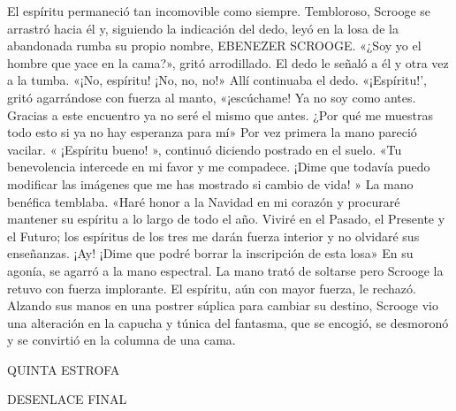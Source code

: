 \documentclass{novela}
\begin{document}
 El espíritu permaneció tan incomovible como siempre.
 Tembloroso, Scrooge se arrastró hacia él y, siguiendo la indicación del dedo, leyó en la losa de la abandonada rumba su propio nombre, EBENEZER SCROOGE.
 «¿Soy yo el hombre que yace en la cama?», gritó arrodillado.
 El dedo le señaló a él y otra vez a la tumba.
 «¡No, espíritu! ¡No, no, no!»
 Allí continuaba el dedo.
 «¡Espíritu!', gritó agarrándose con fuerza al manto, «¡escúchame! Ya no soy como antes. Gracias a este encuentro ya no seré el mismo que antes. ¿Por qué me muestras todo esto si ya no hay esperanza para mí»
 Por vez primera la mano pareció vacilar.
 « ¡Espíritu bueno! », continuó diciendo postrado en el suelo. «Tu benevolencia intercede en mi favor y me compadece. ¡Dime que todavía puedo modificar las imágenes que me has mostrado si cambio de vida! »
 La mano benéfica temblaba.
 «Haré honor a la Navidad en mi corazón y procuraré mantener su espíritu a lo largo de todo el año. Viviré en el Pasado, el Presente y el Futuro; los espíritus de los tres me darán fuerza interior y no olvidaré sus enseñanzas. ¡Ay! ¡Dime que podré borrar la inscripción de esta losa»
 En su agonía, se agarró a la mano espectral. La mano trató de soltarse pero Scrooge la retuvo con fuerza implorante. El espíritu, aún con mayor fuerza, le rechazó.
 Alzando sus manos en una postrer súplica para cambiar su destino, Scrooge vio una alteración en la capucha y túnica del fantasma, que se encogió, se desmoronó y se convirtió en la columna de una cama.




 QUINTA ESTROFA


 DESENLACE FINAL
\end{document}
